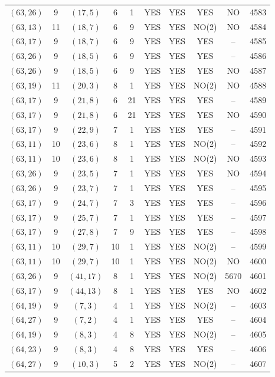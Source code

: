 \begin{longtable}{|c|c|c|c|c|c|c|c|c|c|}
$(63, 26)$ & 9 & $(17, 5)$ & 6 & 1 & YES & YES & YES & NO & 4583\\
$(63, 13)$ & 11 & $(18, 7)$ & 6 & 9 & YES & YES & NO(2) & NO & 4584\\
$(63, 17)$ & 9 & $(18, 7)$ & 6 & 9 & YES & YES & YES & -- & 4585\\
$(63, 26)$ & 9 & $(18, 5)$ & 6 & 9 & YES & YES & YES & -- & 4586\\
$(63, 26)$ & 9 & $(18, 5)$ & 6 & 9 & YES & YES & YES & NO & 4587\\
$(63, 19)$ & 11 & $(20, 3)$ & 8 & 1 & YES & YES & NO(2) & NO & 4588\\
$(63, 17)$ & 9 & $(21, 8)$ & 6 & 21 & YES & YES & YES & -- & 4589\\
$(63, 17)$ & 9 & $(21, 8)$ & 6 & 21 & YES & YES & YES & NO & 4590\\
$(63, 17)$ & 9 & $(22, 9)$ & 7 & 1 & YES & YES & YES & -- & 4591\\
$(63, 11)$ & 10 & $(23, 6)$ & 8 & 1 & YES & YES & NO(2) & -- & 4592\\
$(63, 11)$ & 10 & $(23, 6)$ & 8 & 1 & YES & YES & NO(2) & NO & 4593\\
$(63, 26)$ & 9 & $(23, 5)$ & 7 & 1 & YES & YES & YES & NO & 4594\\
$(63, 26)$ & 9 & $(23, 7)$ & 7 & 1 & YES & YES & YES & -- & 4595\\
$(63, 17)$ & 9 & $(24, 7)$ & 7 & 3 & YES & YES & YES & -- & 4596\\
$(63, 17)$ & 9 & $(25, 7)$ & 7 & 1 & YES & YES & YES & -- & 4597\\
$(63, 17)$ & 9 & $(27, 8)$ & 7 & 9 & YES & YES & YES & -- & 4598\\
$(63, 11)$ & 10 & $(29, 7)$ & 10 & 1 & YES & YES & NO(2) & -- & 4599\\
$(63, 11)$ & 10 & $(29, 7)$ & 10 & 1 & YES & YES & NO(2) & NO & 4600\\
$(63, 26)$ & 9 & $(41, 17)$ & 8 & 1 & YES & YES & NO(2) & 5670 & 4601\\
$(63, 17)$ & 9 & $(44, 13)$ & 8 & 1 & YES & YES & YES & NO & 4602\\
$(64, 19)$ & 9 & $(7, 3)$ & 4 & 1 & YES & YES & NO(2) & -- & 4603\\
$(64, 27)$ & 9 & $(7, 2)$ & 4 & 1 & YES & YES & YES & -- & 4604\\
$(64, 19)$ & 9 & $(8, 3)$ & 4 & 8 & YES & YES & NO(2) & -- & 4605\\
$(64, 23)$ & 9 & $(8, 3)$ & 4 & 8 & YES & YES & YES & -- & 4606\\
$(64, 27)$ & 9 & $(10, 3)$ & 5 & 2 & YES & YES & NO(2) & -- & 4607\\

\end{longtable}
